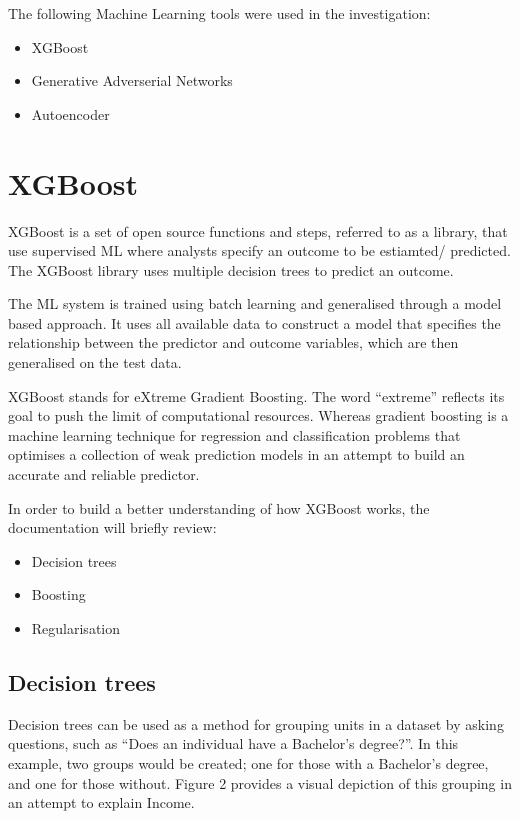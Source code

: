 \documentclass[]{book}
\providecommand{\tightlist}{%
  \setlength{\itemsep}{0pt}\setlength{\parskip}{0pt}}
\begin{document}
The following Machine Learning tools were used in the investigation:

\begin{itemize}
\tightlist
\item
  XGBoost\\
\item
  Generative Adverserial Networks\\
\item
  Autoencoder
\end{itemize}

\chapter{XGBoost}\label{xgboost}

XGBoost is a set of open source functions and steps, referred to as a
library, that use supervised ML where analysts specify an outcome to be
estiamted/ predicted. The XGBoost library uses multiple decision trees
to predict an outcome.

The ML system is trained using batch learning and generalised through a
model based approach. It uses all available data to construct a model
that specifies the relationship between the predictor and outcome
variables, which are then generalised on the test data.

XGBoost stands for eXtreme Gradient Boosting. The word ``extreme''
reflects its goal to push the limit of computational resources. Whereas
gradient boosting is a machine learning technique for regression and
classification problems that optimises a collection of weak prediction
models in an attempt to build an accurate and reliable predictor.

In order to build a better understanding of how XGBoost works, the
documentation will briefly review:

\begin{itemize}
\tightlist
\item
  Decision trees\\
\item
  Boosting\\
\item
  Regularisation
\end{itemize}

\section{Decision trees}\label{decision-trees}

Decision trees can be used as a method for grouping units in a dataset
by asking questions, such as ``Does an individual have a Bachelor's
degree?''. In this example, two groups would be created; one for those
with a Bachelor's degree, and one for those without. Figure 2 provides a
visual depiction of this grouping in an attempt to explain Income.
\end{document}
